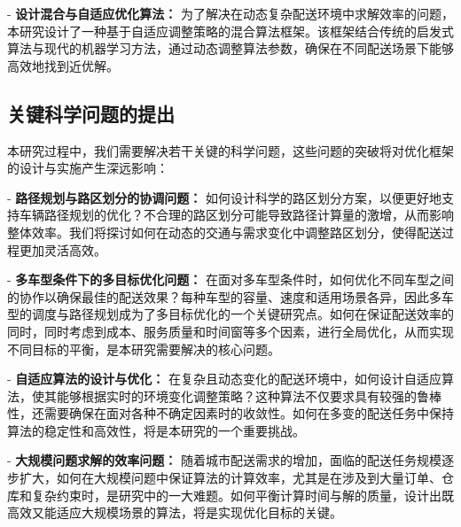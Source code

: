\documentclass[12pt,a4paper,twoside]{ctexbook}
\begin{document}
- \textbf{设计混合与自适应优化算法：} 为了解决在动态复杂配送环境中求解效率的问题，本研究设计了一种基于自适应调整策略的混合算法框架。该框架结合传统的启发式算法与现代的机器学习方法，通过动态调整算法参数，确保在不同配送场景下能够高效地找到近优解。

\subsection{关键科学问题的提出}

本研究过程中，我们需要解决若干关键的科学问题，这些问题的突破将对优化框架的设计与实施产生深远影响：

- \textbf{路径规划与路区划分的协调问题：} 如何设计科学的路区划分方案，以便更好地支持车辆路径规划的优化？不合理的路区划分可能导致路径计算量的激增，从而影响整体效率。我们将探讨如何在动态的交通与需求变化中调整路区划分，使得配送过程更加灵活高效。

- \textbf{多车型条件下的多目标优化问题：} 在面对多车型条件时，如何优化不同车型之间的协作以确保最佳的配送效果？每种车型的容量、速度和适用场景各异，因此多车型的调度与路径规划成为了多目标优化的一个关键研究点。如何在保证配送效率的同时，同时考虑到成本、服务质量和时间窗等多个因素，进行全局优化，从而实现不同目标的平衡，是本研究需要解决的核心问题。

- \textbf{自适应算法的设计与优化：} 在复杂且动态变化的配送环境中，如何设计自适应算法，使其能够根据实时的环境变化调整策略？这种算法不仅要求具有较强的鲁棒性，还需要确保在面对各种不确定因素时的收敛性。如何在多变的配送任务中保持算法的稳定性和高效性，将是本研究的一个重要挑战。

- \textbf{大规模问题求解的效率问题：} 随着城市配送需求的增加，面临的配送任务规模逐步扩大，如何在大规模问题中保证算法的计算效率，尤其是在涉及到大量订单、仓库和复杂约束时，是研究中的一大难题。如何平衡计算时间与解的质量，设计出既高效又能适应大规模场景的算法，将是实现优化目标的关键。
\end{document}
